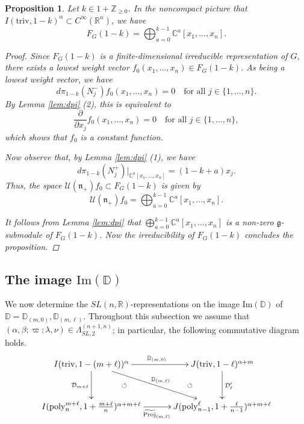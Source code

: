 \documentclass[reqno,11pt]{amsart}
\newtheorem{prop}[equation]{Proposition}
\theoremstyle{remark}
\theoremstyle{definition}
\numberwithin{equation}{section}
\newcommand{\gb}{\beta}
\newcommand{\ga}{\alpha}
\newcommand{\gL}{\Lambda}
\newcommand{\fg}{{\mathfrak g}}
\newcommand{\fn}{{\mathfrak n}}
\newcommand{\R}{\mathbb{R}}
\newcommand{\C}{\mathbb{C}}
\newcommand{\Z}{\mathbb{Z}}
\newcommand{\Cal}{\mathcal}
\renewcommand{\Im}{\mathrm{Im}}
\newcommand{\poly}{\mathrm{poly}}
\newcommand{\triv}{\mathrm{triv}}
\newcommand{\dpi}{d\pi}
\newcommand{\wProj}{\widetilde{\mathrm{Proj}}}
\newcommand{\D}{\Cal{D}}
\newcommand{\bD}{\mathbb{D}}
\begin{document}
\begin{prop}\label{prop:FG}
Let $k \in 1+\Z_{\geq 0}$.
In the noncompact picture that $I(\triv, 1-k)^\ga \subset C^\infty(\R^n)$, we have 
\begin{equation*}
F_G(1-k) = 
\bigoplus_{a=0}^{k-1}\C^a[x_1, \ldots, x_n].
\end{equation*}

\begin{proof}
Since $F_G(1-k)$ is a finite-dimensional irreducible representation of $G$,
there exists a lowest weight vector $f_0(x_1,\ldots,x_n) \in F_G(1-k)$. As being
a lowest weight vector, we have 
\begin{equation*}
\dpi_{1-k}(N_j^-)f_0(x_1,\ldots, x_n)=0
\quad 
\text{for all $j \in \{1,\ldots, n\}$}.
\end{equation*}
By Lemma \ref{lem:dpi} (2), this is equivalent to 
\begin{equation*}
\frac{\partial}{\partial x_j} f_0(x_1,\ldots, x_n) = 0
\quad 
\text{for all $j \in \{1,\ldots, n\}$},
\end{equation*}
which shows that $f_0$ is a constant function.

Now observe that, by Lemma \ref{lem:dpi} (1), we have 
\begin{equation*}
\dpi_{1-k}(N_j^+)\vert_{\C^a[x_1,\ldots, x_n]} =(1-k + a )x_j.
\end{equation*}
Thus, the space $\Cal{U}(\fn_+)f_0 \subset F_G(1-k)$ is given by
\begin{equation*}
\Cal{U}(\fn_+)f_0 = \bigoplus_{a=0}^{k-1}\C^a[x_1, \ldots, x_n].
\end{equation*}

It follows from Lemma \ref{lem:dpi} that 
$\bigoplus_{a=0}^{k-1}\C^a[x_1, \ldots, x_n]$ is a non-zero $\fg$-submodule
of $F_G(1-k)$.
Now the irreducibility of $F_G(1-k)$ concludes the proposition.
\end{proof}

\end{prop}

\subsection{The image $\Im(\bD)$}
\label{sec:image2}

We now determine the  $SL(n,\R)$-representations on the image $\Im(\bD)$ 
of $\bD=\bD_{(m,0)}, \bD_{(m,\ell)}$.
Throughout this subsection we assume that 
$(\ga,\gb;\varpi;\lambda ,\nu) \in \gL^{(n+1,n)}_{SL,2}$; in particular,
the following commutative diagram holds.
\begin{equation*}
\xymatrix@=13pt{
I(\triv, 1-(m+\ell))^\ga
 \ar[dd]_{\D_{m+\ell}}
  \ar[rrdd]^{\bD_{(m,\ell)}}
  \ar[rr]^{\bD_{(m,0)}}
 && J(\triv, 1-\ell)^{\ga+m}
  \ar[dd]^{\D'_\ell}
  \ar@{}[ldd]|{\circlearrowleft}
 \\
&&\\
I(\poly^{m+\ell}_n, 1+\tfrac{m+\ell}{n})^{\ga+m+\ell}
\ar[rr]_{\wProj_{(m,\ell)}}   \ar@{}[ruu]|{\circlearrowleft}
&&
J(\poly^\ell_{n-1}, 1+\tfrac{\ell}{n-1})^{\ga+m+\ell}
}
\end{equation*}
\end{document}

